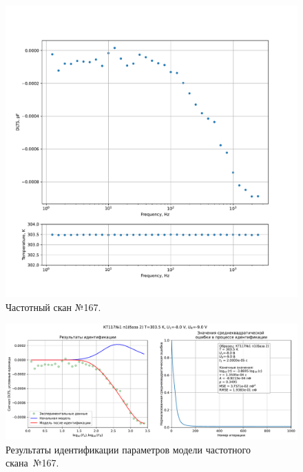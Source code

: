 \begin{figure}[!ht]
    \centering
    \includegraphics[width=1\textwidth]{../plots/КТ117№1_п1(база 2)_2500Гц-1Гц_1пФ_+30С_-8В-9В_20мВ_20мкс_шаг_0,1.pdf}
    \caption{Частотный скан №167.}
    \label{pic:frequency_scan_167}
\end{figure}

\begin{figure}[!ht]
    \centering
    \includegraphics[width=1\textwidth]{../plots/КТ117№1_п1(база 2)_2500Гц-1Гц_1пФ_+30С_-8В-9В_20мВ_20мкс_шаг_0,1_model.pdf}
    \caption{Результаты идентификации параметров модели частотного скана~№167.}
    \label{pic:frequency_scan_model167}
\end{figure}

\pagebreak


